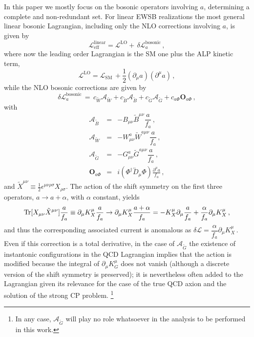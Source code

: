 \documentclass[11pt]{article}
\newcommand{\A}{\mathcal{A}}
\renewcommand{\O}{\mathbf{O}}
\newcommand{\BBd}{B_{\mu\nu}}
\newcommand{\WWd}{W_{\mu\nu}}
\newcommand{\tr}{{\rm Tr}}
\renewcommand{\to}{\rightarrow}
\newcommand{\de}{\partial}
\newcommand{\derp}{\partial}
\newcommand{\beq}{\begin{equation}}
\newcommand{\eeq}{\end{equation}}
\renewcommand{\[}{\begin{equation}}
\renewcommand{\]}{\end{equation}}
\newcommand{\LL}{\mathscr{L}}
\begin{document}
In this paper we mostly focus on the bosonic operators involving $a$, determining a complete and non-redundant set. For linear EWSB realizations 
  the most general  linear bosonic Lagrangian, including only the  NLO corrections involving $a$, is given by 
\beq
\LL_\text{eff}^\text{linear}=\LL^{\text{LO}}+\, \delta\LL_a^\text{bosonic}\,, 
\label{Lbosonic-lin}
\eeq
where now the leading order Lagrangian is the SM one plus the ALP kinetic term,
\beq
\LL^{\text{LO}}=\LL_\text{SM}\,+\frac{1}{2}(\partial_\mu a)(\partial^\mu a)\,,
\label{Lbosonic-lin}
\eeq
while the NLO bosonic corrections are given by
\beq
\delta\LL_a^\text{bosonic}\,=\,c_{\tilde{W}}\A_{\tilde{W}}+c_{\tilde{B}}\A_{\tilde{B}}+c_{\tilde{G}}\A_{\tilde{G}}+c_{a\Phi}\O_{a\Phi}\,,
\label{deltaLbosonic-lin-initial}
\eeq
with
\begin{eqnarray}
\A_{\tilde{B}} &=&-\BBd\tilde{B}^{\mu\nu}\dfrac{a}{f_a}\,,\label{ABtilde}\\
\A_{\tilde{W}} &=&-\WWd^a\tilde{W}^{a\mu\nu}\dfrac{a}{f_a}\,,\label{AWtilde}\\
\A_{\tilde{G}} &=&-G^a_{\mu\nu}\tilde{G}^{a\mu\nu}\dfrac{a}{f_a}\,,\label{AGtilde}\\
\O_{a\Phi}&=& i (\Phi^\dag\overleftrightarrow{D}_\mu\Phi)\frac{\de^\mu a}{f_a}\,,\label{OaPhi}
\end{eqnarray}
and $\tilde{X}^{\mu\nu}\equiv \frac12 \epsilon^{\mu\nu\rho\sigma}X_{\rho\sigma}$.  The action of the shift symmetry on the first three operators, $a\to a+\alpha$, with $\alpha$ constant, yields 
\beq\label{aXXtilde_shift}
\tr[X_{\mu\nu}\tilde{X}^{\mu\nu}]\dfrac{a}{f_a}\equiv
\derp_\mu K_X^\mu\dfrac{a}{f_a}\to
\derp_\mu K_X^\mu\dfrac{a+\alpha}{f_a}=
-K_X^\mu\partial_\mu \dfrac{a}{f_a}+\dfrac{\alpha}{f_a}\partial_\mu K_X^\mu\,, 
\eeq
 and thus the corresponding associated current is anomalous as $\delta \LL = \dfrac{\alpha}{f_a}\partial_\mu K_X^\mu\,$. 
 Even if this correction is a total derivative, in the case of $\A_{\tilde G}$ the existence of instantonic configurations in the QCD Lagrangian 
implies that the action is modified because the integral of $\de_\mu K^\mu_G$ does not vanish (although a discrete version of the shift symmetry is preserved); it is nevertheless often added to the Lagrangian given its relevance for the case of the true QCD axion and the solution of the strong CP problem. \footnote{In any case, $\A_{\tilde G}$ will play no role whatsoever in the analysis to be performed in this work.}
\end{document}
